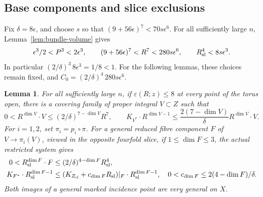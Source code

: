 \documentclass[12pt,a4paper,psamsfonts]{amsart}
\theoremstyle{definition}
\theoremstyle{plain}
\newtheorem{lemma}{Lemma}[section]
\begin{document}
\subsection{Base components and slice exclusions}

Fix $\delta=8\epsilon$, and choose $s$ so that
$(9+56\epsilon)^7<70s\epsilon^6$.
For all sufficiently large $n$, Lemma~\ref{lem:bundle-volume} gives
\[
 \epsilon^3/2<P^3<2\epsilon^3,\qquad
 (9+56\epsilon)^7<R^7<280s\epsilon^6,\qquad R_{\rm sl}^4<8s\epsilon^3.
\]
In particular $(2/\delta)^3\,8\epsilon^3=1/8<1$.
For the following lemmas, these choices remain fixed, and
$C_0=(2/\delta)^4\,280s\epsilon^6$.

\begin{lemma}\label{lem:sevenfold-centres}
For all sufficiently large $n$, if $\varepsilon(R;z)\le8$ at every
point of the torus open, there is a covering family of proper
integral $V\subset Z$ such that
\begin{equation}\label{eq:sevenfold-centres}
 0<R^{\dim V}\cdot V\le(2/\delta)^{7-\dim V}R^7,\qquad
 K_{V^*}\cdot R^{\dim V-1}\le\frac{2(7-\dim V)}{\delta}R^{\dim V}\cdot V.
\end{equation}
For $i=1,2$, set $\pi_i=p_i\circ\pi$. For a general reduced fibre
component $F$ of $V\to\pi_i(V)$, viewed in the opposite fourfold slice, if
$1\le\dim F\le3$, the actual restricted system gives
\begin{equation}\label{eq:slice-centres}
 \begin{split}
 0<R_{\rm sl}^{\dim F}\cdot F&\le(2/\delta)^{4-\dim F}R_{\rm sl}^4,\\
 K_{F^*}\cdot R_{\rm sl}^{\dim F-1}
 &\le(K_{Z_{\rm sl}}+c_{\dim F}R_{\rm sl})|_F \cdot R_{\rm sl}^{\dim F-1},
 \quad 0<c_{\dim F}\le2(4-\dim F)/\delta.
 \end{split}
\end{equation}
Both images of a general marked incidence point are very general on $X$.
\end{lemma}
\end{document}
